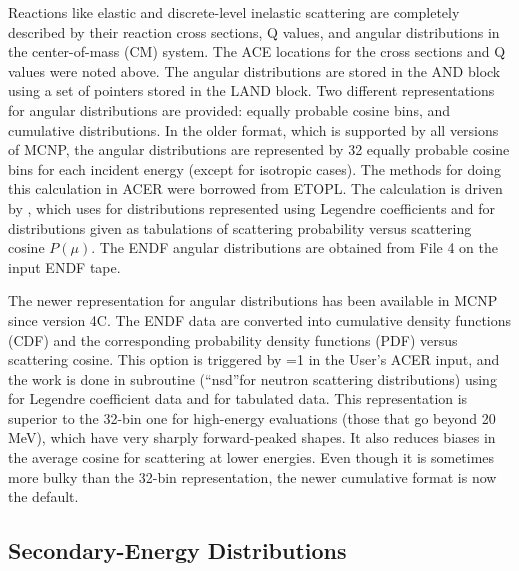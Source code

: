 Reactions like elastic and discrete-level inelastic scattering are
completely described by their reaction cross sections, Q values, and
angular distributions in the center-of-mass (CM) system.  The ACE
locations for the cross sections and Q values were noted above.  The
angular distributions are stored in the AND block using a set of
pointers stored in the LAND block.  Two different representations
for angular distributions are provided: equally probable cosine bins,
and cumulative distributions.  In the older format, which is supported
by all versions of MCNP, the angular distributions are represented
by 32 equally probable cosine bins for each incident energy (except
for isotropic cases).  The methods for doing this calculation in ACER
were borrowed from ETOPL\cite{ETOPL}.  The calculation
is driven by , which uses
 for distributions represented
using Legendre coefficients and 
for distributions given as tabulations of scattering probability
versus scattering cosine $P(\mu)$.  The ENDF angular distributions
 are obtained from File 4 on the input
ENDF tape.

The newer representation for angular distributions has been available
in MCNP since version 4C.  The ENDF data are converted into cumulative
density functions (CDF) and the corresponding probability density
functions (PDF) versus scattering cosine.  This option is triggered
by =1 in the User's ACER input, and the work is done in subroutine
 (``nsd''for neutron scattering
distributions) using  for
Legendre coefficient data and 
for tabulated data.  This representation is superior to the 32-bin one
for high-energy evaluations (those that go beyond 20 MeV), which have
very sharply forward-peaked shapes.  It also reduces biases in the
average cosine for scattering at lower energies.  Even though it is
sometimes more bulky than the 32-bin representation, the newer cumulative
format is now the default.

\subsection{Secondary-Energy Distributions}
\label{ssACER_sed}

